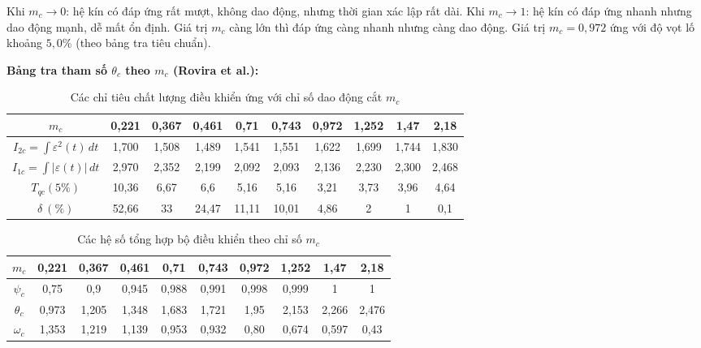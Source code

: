 \documentclass[../main.tex]{subfiles}
\begin{document}
Khi $m_c \to 0$: hệ kín có đáp ứng rất mượt, không dao động, nhưng thời gian xác lập rất dài. Khi $m_c \to 1$: hệ kín có đáp ứng nhanh nhưng dao động mạnh, dễ mất ổn định. Giá trị $m_c$ càng lớn thì đáp ứng càng nhanh nhưng càng dao động. Giá trị $m_c = 0{,}972$ ứng với độ vọt lố khoảng $5{,}0\%$ (theo bảng tra tiêu chuẩn).

\textbf{Bảng tra tham số $\theta_c$ theo $m_c$ (Rovira et al.):}

\begin{table}[H]
    \centering
    \caption{Các chỉ tiêu chất lượng điều khiển ứng với chỉ số dao động cắt $m_c$}
    \label{tab:bang_9_1}
    \renewcommand{\arraystretch}{1.4}
    \setlength{\tabcolsep}{4pt}
    \begin{tabular}{|c|c|c|c|c|c|c|c|c|c|}
    \hline
    $m_c$
    & 0,221 & 0,367 & 0,461 & 0,71 & 0,743 & 0,972 & 1,252 & 1,47 & 2,18 \\
    \hline
    $I_{2c}=\displaystyle\int \varepsilon^2(t)\,dt$
    & 1,700 & 1,508 & \cellcolor{yellow}1,489 & 1,541 & 1,551 & 1,622 & 1,699 & 1,744 & 1,830 \\
    \hline
    $I_{1c}=\displaystyle\int |\varepsilon(t)|\,dt$
    & 2,970 & 2,352 & 2,199 & \cellcolor{yellow}2,092 & 2,093 & 2,136 & 2,230 & 2,300 & 2,468 \\
    \hline
    $T_{qc}(5\%)$
    & 10,36 & 6,67 & 6,6 & 5,16 & 5,16 & \cellcolor{yellow}3,21 & 3,73 & 3,96 & 4,64 \\
    \hline
    $\delta~(\%)$
    & 52,66 & 33 & 24,47 & 11,11 & 10,01 & 4,86 & 2 & 1 & 0,1 \\
    \hline
    \end{tabular}
\end{table}

\begin{table}[H]
    \centering
    \caption{Các hệ số tổng hợp bộ điều khiển theo chỉ số $m_c$}
    \label{tab:bang_9_2}
    \renewcommand{\arraystretch}{1.4}
    \setlength{\tabcolsep}{6pt}
    \begin{tabular}{|c|c|c|c|c|c|c|c|c|c|}
    \hline
    $m_c$
    & 0,221 & 0,367 & 0,461 & 0,71 & 0,743 & 0,972 & 1,252 & 1,47 & 2,18 \\
    \hline
    $\psi_c$
    & 0,75 & 0,9 & 0,945 & 0,988 & 0,991 & 0,998 & 0,999 & 1 & 1 \\
    \hline
    $\theta_c$
    & 0,973 & 1,205 & 1,348 & 1,683 & 1,721 & 1,95 & 2,153 & 2,266 & 2,476 \\
    \hline
    $\omega_c$
    & 1,353 & 1,219 & 1,139 & 0,953 & 0,932 & 0,80 & 0,674 & 0,597 & 0,43 \\
    \hline
    \end{tabular}
\end{table}
\end{document}

